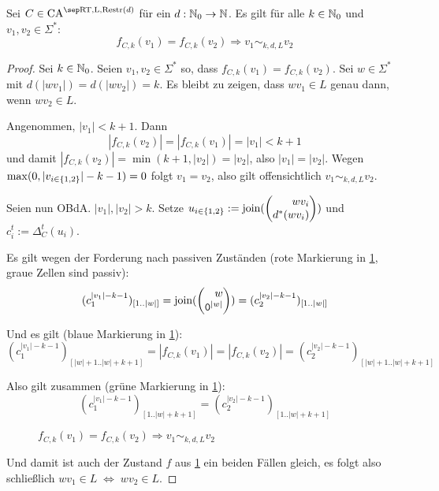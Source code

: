 \begin{satz}
    \label{satzFEqualsImpliesEquiv}
    Sei $C \in \CAM{\CART, \CALeft, \CARestr(d)}$ für ein $d: \mathbb{N}_0 \to \mathbb{N}$. Es gilt für alle $k \in \mathbb{N}_0$ und $v_1, v_2 \in \Sigma^*$:
    \[
        f_{C, k}(v_1) = f_{C, k}(v_2) \Rightarrow v_1 \sim_{k,d,L} v_2
    \]
\end{satz}
\begin{proof}
    Sei $k \in \mathbb{N}_0$. Seien $v_1, v_2 \in \Sigma^*$ so, dass $f_{C, k}(v_1) = f_{C, k}(v_2)$.
    Sei $w \in \Sigma^*$ mit $d(|wv_1|) = d(|wv_2|) = k$.
    Es bleibt zu zeigen, dass $wv_1 \in L$ genau dann, wenn $wv_2 \in L$.
    
    Angenommen, $|v_1| < k + 1$. Dann 
    \[
        |f_{C, k}(v_2)| = |f_{C, k}(v_1)| = |v_1| < k + 1
    \]
    und damit $|f_{C, k}(v_2)| = \min(k+1, |v_2|) = |v_2|$, also $|v_1| = |v_2|$.
    Wegen $\max(0, |v_{i \in \{ {1,2} \}}|-k-1) = 0$ folgt $v_1 = v_2$, also gilt offensichtlich $v_1 \sim_{k,d,L} v_2$.
    
    Seien nun \acs{OBdA.} $|v_1|, |v_2| > k$.
    Setze $u_{i \in \finset{1, 2}} := \joinw(\Spvek{ wv_i; d^*(wv_i) })$
    und $c^t_i := \Delta_C^{t}( u_i )$.
    
    Es gilt wegen der Forderung nach passiven Zuständen (rote Markierung in \cref{fig:RestrAutomata_fCk_Equiv}, graue Zellen sind passiv): 
    \[(c_1^{|v_1|-k-1})_{[1..|w|]} = \joinw(\Spvek{ w; \chr{0}^{|w|} }) = (c_2^{|v_2|-k-1})_{[1..|w|]}\]
    
    Und es gilt (blaue Markierung in \cref{fig:RestrAutomata_fCk_Equiv}): 
    \[(c_1^{|v_1|-k-1})_{[|w|+1..|w|+k+1]} = |f_{C, k}(v_1)| = |f_{C, k}(v_2)| = (c_2^{|v_2|-k-1})_{[|w|+1..|w|+k+1]}\]
    
    
    Also gilt zusammen (grüne Markierung in \cref{fig:RestrAutomata_fCk_Equiv}): 
    \[(c_1^{|v_1|-k-1})_{[1..|w|+k+1]} = (c_2^{|v_2|-k-1})_{[1..|w|+k+1]}\]
    
    \begin{figure}[h!]
        \centering
        
        \caption{$f_{C,k}(v_1) = f_{C,k}(v_2) \Rightarrow v_1 \sim_{k,d,L} v_2$}
        \label{fig:RestrAutomata_fCk_Equiv}
    \end{figure}
    
    Und damit ist auch der Zustand $f$ aus \cref{fig:RestrAutomata_fCk_Equiv} ein beiden Fällen gleich,
    es folgt also schließlich $wv_1 \in L \; \Leftrightarrow \; wv_2 \in L$.
\end{proof}

